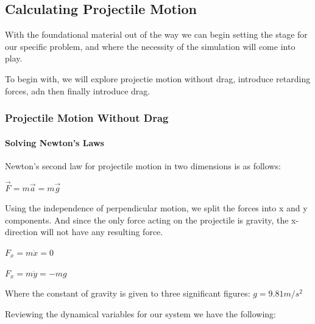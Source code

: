 \documentclass[11pt]{article}
\begin{document}
\hypertarget{calculating-projectile-motion}{%
\subsection{\texorpdfstring{\textbf{Calculating Projectile
Motion}}{Calculating Projectile Motion}}\label{calculating-projectile-motion}}

With the foundational material out of the way we can begin setting the
stage for our specific problem, and where the necessity of the
simulation will come into play.

To begin with, we will explore projectie motion without drag, introduce
retarding forces, adn then finally introduce drag.

\hypertarget{projectile-motion-without-drag}{%
\subsubsection{\texorpdfstring{\textbf{Projectile Motion Without
Drag}}{Projectile Motion Without Drag}}\label{projectile-motion-without-drag}}

\hypertarget{solving-newtons-laws}{%
\paragraph{\texorpdfstring{\textbf{Solving Newton's
Laws}}{Solving Newton's Laws}}\label{solving-newtons-laws}}

Newton's second law for projectile motion in two dimensions is as
follows:

\(\vec{F} = m \vec{a} = m \vec{g}\)

Using the independence of perpendicular motion, we split the forces into
x and y components. And since the only force acting on the projectile is
gravity, the x-direction will not have any resulting force.

\(F_x = m \ddot{x} = 0\)

\(F_x = m \ddot{y} = -mg\)

Where the constant of gravity is given to three significant figures:
\(g = 9.81 m/s^2\)

Reviewing the dynamical variables for our system we have the following:
\end{document}
